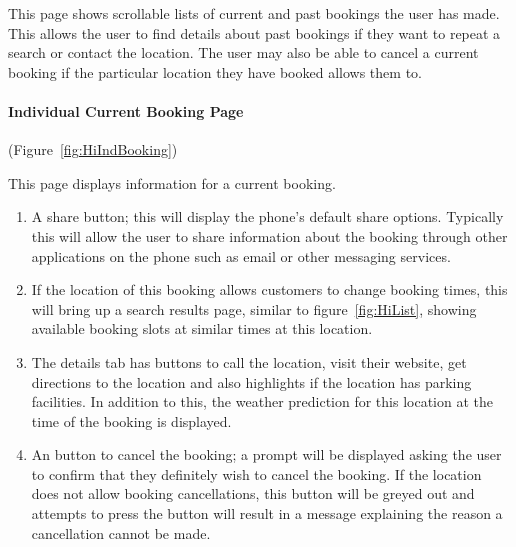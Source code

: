 
This page shows scrollable lists of current and past bookings the user has
made. This allows the user to find details about past bookings if they want to
repeat a search or contact the location. The user may also be able to cancel a
current booking if the particular location they have booked allows them to.

\paragraph{Individual Current Booking Page} (Figure~\ref{fig:HiIndBooking})


This page displays information for a current booking.
\begin{enumerate}
	\item A share button; this will display the phone's default share options.
		Typically this will allow the user to share information about the
		booking through other applications on the phone such as email or other
		messaging services.
	\item If the location of this booking allows customers to change booking
		times, this will bring up a search results page, similar to
		figure~\ref{fig:HiList}, showing available booking slots at similar
		times at this location.
	\item The details tab has buttons to call the location, visit their
		website, get directions to the location and also highlights if the
		location has parking facilities. In addition to this, the weather
		prediction for this location at the time of the booking is displayed.
	\item An button to cancel the booking; a prompt will be displayed asking
		the user to confirm that they definitely wish to cancel the booking.
		If the location does not allow booking cancellations, this button will
		be greyed out and attempts to press the button will result in a message
		explaining the reason a cancellation cannot be made.
\end{enumerate}

